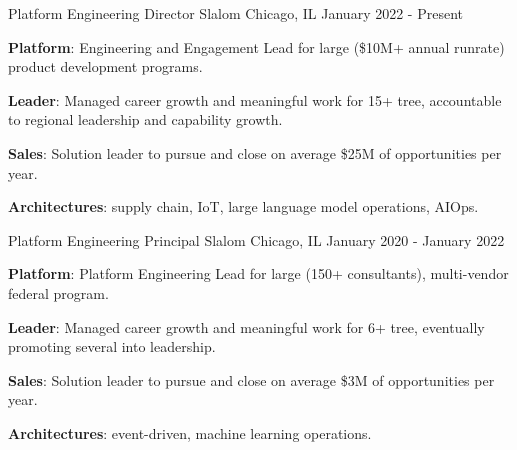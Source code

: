 

\begin{cventries}

  \cventry
    {Platform Engineering Director} %
    {Slalom} %
    {Chicago, IL} %
    {January 2022 - Present} %
    {
      \begin{cvitems} %
        \item {\textbf{Platform}: Engineering and Engagement Lead for large (\$10M+ annual runrate) product development programs.}
        \item {\textbf{Leader}: Managed career growth and meaningful work for 15+ tree, accountable to regional leadership and capability growth.}
        \item {\textbf{Sales}: Solution leader to pursue and close on average \$25M of opportunities per year.}
        \item {\textbf{Architectures}: supply chain, IoT, large language model operations, AIOps.}
      \end{cvitems}
    }

  \cventry
    {Platform Engineering Principal} %
    {Slalom} %
    {Chicago, IL} %
    {January 2020 - January 2022} %
    {
      \begin{cvitems} %
        \item {\textbf{Platform}: Platform Engineering Lead for large (150+ consultants), multi-vendor federal program.}
        \item {\textbf{Leader}: Managed career growth and meaningful work for 6+ tree, eventually promoting several into leadership.}
        \item {\textbf{Sales}: Solution leader to pursue and close on average \$3M of opportunities per year.}
        \item {\textbf{Architectures}: event-driven, machine learning operations.}
      \end{cvitems}
    }


\end{cventries}
